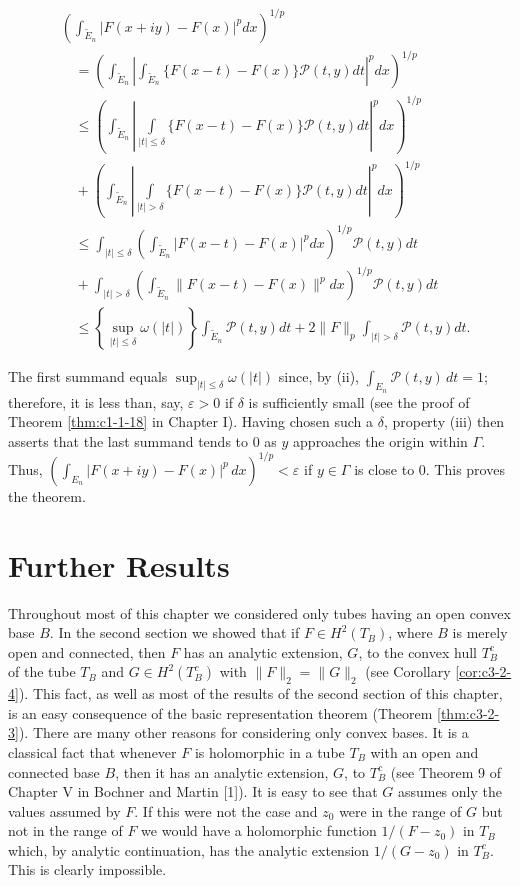 \[
\begin{aligned}&\left(\int_{\tilde{E}_{n}}|F(x+iy)-F(x)|^{p} dx\right)^{1/p}\\&\quad=\left(\int_{\tilde{E}_{n}}\left|\int_{\tilde{E}_{n}}\{F(x-t)-F(x)\}\mathcal{P}(t,y)dt\right|^{p} dx\right)^{1/p}\\&\quad\leq\left(\int_{\tilde{E}_{n}}\left|\int\limits_{|t|\leq\delta}\{F(x-t)-F(x)\}\mathcal{P}(t,y)dt\right|^{p} dx\right)^{1/p}\\&\quad+\left(\int_{\tilde{E}_{n}}\left|\int\limits_{|t|>\delta}\{F(x-t)-F(x)\}\mathcal{P}(t,y)dt\right|^{p} dx\right)^{1/p}\\&\quad\leq\int_{|t|\leq\delta}\left(\int_{\tilde{E}_{n}}|F(x-t)-F(x)|^{p} dx\right)^{1/p}\mathcal{P}(t,y)dt\\&\quad+\int_{|t|>\delta}\left(\int_{\tilde{E}_{n}}\|F(x-t)-F(x)\|^{p} dx\right)^{1/p}\mathcal{P}(t,y)dt\\&\quad\leq\left\{\sup_{|t|\leq\delta}\omega(|t|)\right\}\int_{\tilde{E}_{n}}\mathcal{P}(t,y)dt+2\|F\|_{p}\int_{|t|>\delta}\mathcal{P}(t,y)dt.\end{aligned}
\]

The first summand equals $\sup_{|t|\leq\delta}\omega(|t|)$ since, by (ii), $\int_{E_n}\mathcal{P}(t,y)\,dt=1$; therefore, it is less than, say, $\varepsilon>0$ if $\delta$ is sufficiently small (see the proof of Theorem \eqref{thm:c1-1-18} in Chapter I). Having chosen such a $\delta$, property (iii) then asserts that the last summand tends to 0 as $y$ approaches the origin within $\Gamma$. Thus, $(\int_{E_n}|F(x+iy)-F(x)|^p\,dx)^{1/p}<\varepsilon$ if $y\in\Gamma$ is close to 0. This proves the theorem.

\section{Further Results}

 Throughout most of this chapter we considered only tubes having an open convex base $B$. In the second section we showed that if $F \in H^2(T_B)$, where $B$ is merely open and connected, then $F$ has an analytic extension, $G$, to the convex hull $T_B^c$ of the tube $T_B$ and $G \in H^2(T_B^c)$ with $\|F\|_2 = \|G\|_2$ (see Corollary \ref{cor:c3-2-4}). This fact, as well as most of the results of the second section of this chapter, is an easy consequence of the basic representation theorem (Theorem \ref{thm:c3-2-3}). There are many other reasons for considering only convex bases. It is a classical fact that whenever $F$ is holomorphic in a tube $T_B$ with an open and connected base $B$, then it has an analytic extension, $G$, to $T_B^c$ (see Theorem 9 of Chapter V in Bochner and Martin [1]). It is easy to see that $G$ assumes only the values assumed by $F$. If this were not the case and $z_0$ were in the range of $G$ but not in the range of $F$ we would have a holomorphic function $1/(F - z_0)$ in $T_B$ which, by analytic continuation, has the analytic extension $1/(G - z_0)$ in $T_B^c$. This is clearly impossible.

